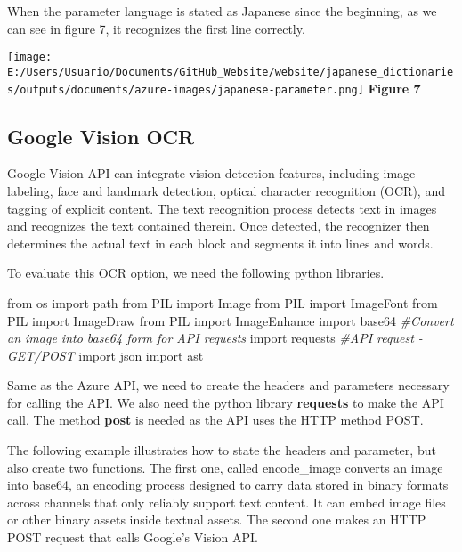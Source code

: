\documentclass[
]{article}
\newenvironment{Shaded}{\begin{snugshade}}{\end{snugshade}}
\newcommand{\CommentTok}[1]{\textcolor[rgb]{0.56,0.35,0.01}{\textit{#1}}}
\newcommand{\ImportTok}[1]{#1}
\newcommand{\NormalTok}[1]{#1}
\begin{document}
When the parameter language is stated as Japanese since the beginning,
as we can see in figure 7, it recognizes the first line correctly.

\texttt{[image: E:/Users/Usuario/Documents/GitHub\_Website/website/japanese\_dictionaries/outputs/documents/azure-images/japanese-parameter.png]}
\textbf{Figure 7}

\hypertarget{google-vision-ocr}{%
\subsection{Google Vision OCR}\label{google-vision-ocr}}

Google Vision API can integrate vision detection features, including
image labeling, face and landmark detection, optical character
recognition (OCR), and tagging of explicit content. The text recognition
process detects text in images and recognizes the text contained
therein. Once detected, the recognizer then determines the actual text
in each block and segments it into lines and words.

To evaluate this OCR option, we need the following python libraries.

\begin{Shaded}
\begin{Highlighting}[]
\ImportTok{from}\NormalTok{ os }\ImportTok{import}\NormalTok{ path}
\ImportTok{from}\NormalTok{ PIL }\ImportTok{import}\NormalTok{ Image}
\ImportTok{from}\NormalTok{ PIL }\ImportTok{import}\NormalTok{ ImageFont}
\ImportTok{from}\NormalTok{ PIL }\ImportTok{import}\NormalTok{ ImageDraw}
\ImportTok{from}\NormalTok{ PIL }\ImportTok{import}\NormalTok{ ImageEnhance}
\ImportTok{import}\NormalTok{ base64 }\CommentTok{#Convert an image into base64 form for API requests}
\ImportTok{import}\NormalTok{ requests }\CommentTok{#API request - GET/POST}
\ImportTok{import}\NormalTok{ json}
\ImportTok{import}\NormalTok{ ast}
\end{Highlighting}
\end{Shaded}

Same as the Azure API, we need to create the headers and parameters
necessary for calling the API. We also need the python library
\textbf{requests} to make the API call. The method \textbf{post} is
needed as the API uses the HTTP method POST.

The following example illustrates how to state the headers and
parameter, but also create two functions. The first one, called
encode\_image converts an image into base64, an encoding process
designed to carry data stored in binary formats across channels that
only reliably support text content. It can embed image files or other
binary assets inside textual assets. The second one makes an HTTP POST
request that calls Google's Vision API.
\end{document}
